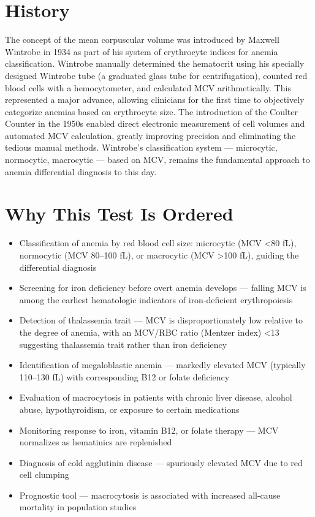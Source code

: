 \section*{History}
The concept of the mean corpuscular volume was introduced by Maxwell Wintrobe in 1934 as part of his system of erythrocyte indices for anemia classification. Wintrobe manually determined the hematocrit using his specially designed Wintrobe tube (a graduated glass tube for centrifugation), counted red blood cells with a hemocytometer, and calculated MCV arithmetically. This represented a major advance, allowing clinicians for the first time to objectively categorize anemias based on erythrocyte size. The introduction of the Coulter Counter in the 1950s enabled direct electronic measurement of cell volumes and automated MCV calculation, greatly improving precision and eliminating the tedious manual methods. Wintrobe's classification system --- microcytic, normocytic, macrocytic --- based on MCV, remains the fundamental approach to anemia differential diagnosis to this day.

\section*{Why This Test Is Ordered}
\begin{itemize}
  \item Classification of anemia by red blood cell size: microcytic (MCV <80 fL), normocytic (MCV 80--100 fL), or macrocytic (MCV >100 fL), guiding the differential diagnosis
  \item Screening for iron deficiency before overt anemia develops --- falling MCV is among the earliest hematologic indicators of iron-deficient erythropoiesis
  \item Detection of thalassemia trait --- MCV is disproportionately low relative to the degree of anemia, with an MCV/RBC ratio (Mentzer index) <13 suggesting thalassemia trait rather than iron deficiency
  \item Identification of megaloblastic anemia --- markedly elevated MCV (typically 110--130 fL) with corresponding B12 or folate deficiency
  \item Evaluation of macrocytosis in patients with chronic liver disease, alcohol abuse, hypothyroidism, or exposure to certain medications
  \item Monitoring response to iron, vitamin B12, or folate therapy --- MCV normalizes as hematinics are replenished
  \item Diagnosis of cold agglutinin disease --- spuriously elevated MCV due to red cell clumping
  \item Prognostic tool --- macrocytosis is associated with increased all-cause mortality in population studies
\end{itemize}

